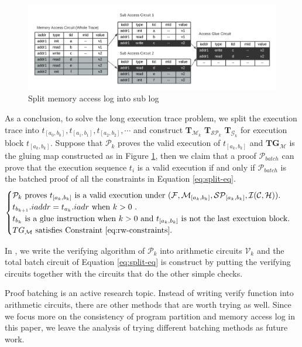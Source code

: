 \begin{figure}[!ht]
\centerline{
\includegraphics[scale=0.6]{figs/memory-glue.png}
}
\caption{Split memory access log into sub log}
\label{fig:tbl-glue}
\end{figure}

\smallskip As a conclusion, to solve the long execution trace problem, we split the execution trace into $t_{[a_0,b_0]}, t_{[a_1,b_1]}, t_{[a_2, b_2]}, \cdots$ and construct $\mathbf{T}_{\mathcal{M}_{k}}$ $\mathbf{T}_{\mathcal{SP}_{k}}$ $\mathbf{T}_{\mathcal{G}_{k}}$ for execution block $t_{[a_k, b_k]}$. Suppose that $\mathcal{P}_k$ proves the valid execution of $t_{[a_k,b_k]}$ and $\mathbf{TG}_\mathcal{M}$ is the gluing map constructed as in Figure \ref{fig:tbl-glue}, then we claim that a proof $\mathcal{P}_{batch}$ can prove that the execution sequence $t_i$ is a valid execution if and only if $\mathcal{P}_{batch}$ is the batched proof of all the constraints in Equation \ref{eq:split-eq}.
\begin{equation}
   \begin{cases}
        \mathcal{P}_k \textrm{ proves }  t_{[a_k,b_k]} \textrm{ is a valid execution under } (\mathcal{F}, \mathcal{M}_{[a_k,b_k]}, \mathcal{SP}_{[a_k,b_k]}, \mathcal{I}(\mathcal{C,\mathcal{H}})). \\
        t_{b_{k+1}}.iaddr = t_{a_{k}}.iadr \textrm{ when $k>0$ }. \\
        t_{b_{k}} \textrm{ is a glue instruction when $k>0$ and $t_{[a_k, b_k]}$ is not the last exectuion block}. \\
        TG_\mathcal{M} \textrm { satisfies Constraint \ref{eq:rw-constraints}}. \\
   \end{cases}
    \label{eq:split-eq}
\end{equation}

\noindent In \zkwasm, we write the verifying algorithm of $\mathcal{P}_k$ into arithmetic circuits $\mathcal{V}_k$ and the total batch circuit of Equation \ref{eq:split-eq} is construct by putting the verifying circuits together with the circuits that do the other simple checks.

\begin{remark}
Proof batching is an active research topic. Instead of writing verify function into arithmetic circuits, there are other methods \cite{ben2017scalable-batch,chiesa2019cycles-batch,habock2021darlin-batch,kothapalli2022nova-batch} that are worth trying as well. Since we focus more on the consistency of program partition and memory access log in this paper, we leave the analysis of trying different batching methods as future work.
\end{remark}
